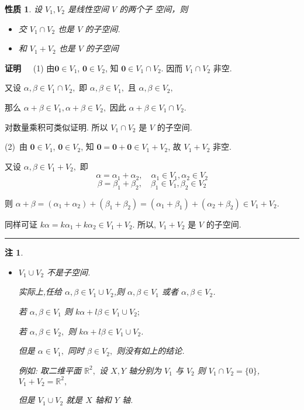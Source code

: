 \documentclass[13pt]{beamer}
\newtheorem*{rem}{注}
\newtheorem*{prop}{性质}
\def\qed{\nopagebreak\hfill{\rule{4pt}{7pt}}\medbreak}
\def\pf{{\bf 证明~~ }}
\def\R{\mathbb{R}}
\def\0{\mathbf{0}}
\begin{document}
\begin{frame}
\small{
\begin{prop}
设 $V_{1}, V_{2}$ 是线性空间 $V$ 的两个子 空间，则
\begin{itemize}
\item 交 $V_{1} \cap V_{2}$ 也是 $V$ 的子空间.
\item 和 $V_{1}+V_{2}$ 也是 $V$ 的子空间
\end{itemize}
\end{prop}

\pf
(1)
由$\0\in V_{1}$, ${\0} \in V_{2}$, 知 ${\0} \in V_{{1}} \cap V_{2}$.
因而 $V_{1} \cap V_{2}$ 非空.

又设 $\alpha, \beta \in V_{1} \cap V_{2},$ 即 $\alpha, \beta \in V_{1},$ 且
$\alpha, \beta \in V_{2},$ 

那么
$\alpha+\beta \in V_{1}, \alpha+\beta \in V_{2},$ 因此
$\alpha+\beta \in V_{1} \cap V_{2} .$ 

对数量乘积可类似证明. 
所以 $V_{1} \cap V_{2}$ 是 $V$ 的子空间.

(2)\, 由 ${\0} \in V_{1}$, ${\0} \in V_{2}$, 知 ${\0}={\0}+{\0} \in V_{{1}}+V_{{2}}$, 
故 $V_{{1}}+V_{2}$ 非空. 

又设 $\alpha, \beta \in V_{1}+V_{2},$ 即 
$$ \alpha=\alpha_{1}+\alpha_{2}, \quad \alpha_{1} \in V_{1},  \alpha_{2} \in V_{2}$$ $$\beta=\beta_{1}+\beta_{2}, \quad \beta_{1} \in V_{1},  \beta_{2} \in V_{2}$$

则 $\alpha+\beta=\left(\alpha_{1}+\alpha_{2}\right)+\left(\beta_{1}+\beta_{2}\right)
=\left(\alpha_{1}+\beta_{1}\right)+\left(\alpha_{2}+\beta_{2}\right) \in V_{1}+V_{2}$.
	 
同样可证 $ {k} \alpha={k} \alpha_{1}+{k} \alpha_{2} \in V_{1}+V_{2}$.	
所以, $V_{1}+V_{2}$ 是 $V$ 的子空间.}\qed
\end{frame}


\begin{frame}
\begin{rem}
	\begin{itemize}
		\item
$V_{1} \cup V_{2}$ 不是子空间. 

实际上,任给 $\alpha, \beta \in V_{1} \cup V_{2}$,则 $\alpha, \beta \in V_{1}$ 或者 $\alpha, \beta \in V_{2}$.

若 $\alpha, \beta \in V_{1}$ 则 $k \alpha+l \beta \in V_{1} \cup V_{2} ;$ 

若 $\alpha, \beta \in V_{2},$ 则 $k \alpha+l \beta \in V_{1} \cup V_{2}$.

但是 $\alpha \in V_{1},$ 同时 $\beta \in V_{2},$ 则没有如上的结论.

例如: 取二维平面 ${\R}^{2},$ 设 $X, Y$ 轴分别为 $V_{1}$ 与 $V_{2}$
则 $V_{1} \cap V_{2}=\{0\}$, $
V_{1}+V_{2}=\R^{2},$ 

但是 $V_{1} \cup V_{2}$ 就是 $X$ 轴和 $Y$ 轴. 

	\end{itemize}
\end{rem}


\end{frame}
\end{document}
